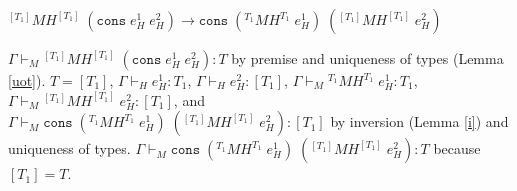 \begin{case}
$^{[T_{1}]}MH^{[T_{1}]}\;(\mathtt{cons}\;e_{H}^{1}\;e_{H}^{2})\rightarrow\mathtt{cons}\;(^{T_{1}}MH^{T_{1}}\;e_{H}^{1})\;(^{[T_{1}]}MH^{[T_{1}]}\;e_{H}^{2})$

$\Gamma\vdash_{M}{^{[T_{1}]}M}H^{[T_{1}]}\;(\mathtt{cons}\;e_{H}^{1}\;e_{H}^{2}):T$ by premise and uniqueness of types (Lemma \ref{uot}).  $T=[T_{1}]$, $\Gamma\vdash_{H}e_{H}^{1}:T_{1}$, $\Gamma\vdash_{H}e_{H}^{2}:[T_{1}]$, $\Gamma\vdash_{M}{^{T_{1}}M}H^{T_{1}}\;e_{H}^{1}:T_{1}$, $\Gamma\vdash_{M}{^{[T_{1}]}M}H^{[T_{1}]}\;e_{H}^{2}:[T_{1}]$, and $\Gamma\vdash_{M}\mathtt{cons}\;(^{T_{1}}MH^{T_{1}}\;e_{H}^{1})\;(^{[T_{1}]}MH^{[T_{1}]}\;e_{H}^{2}):[T_{1}]$ by inversion (Lemma \ref{i}) and uniqueness of types.  $\Gamma\vdash_{M}\mathtt{cons}\;(^{T_{1}}MH^{T_{1}}\;e_{H}^{1})\;(^{[T_{1}]}MH^{[T_{1}]}\;e_{H}^{2}):T$ because $[T_{1}]=T$.
\end{case}